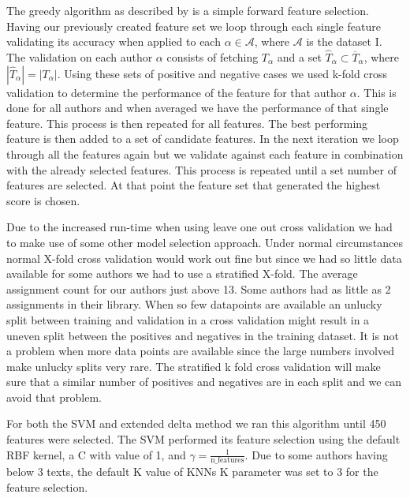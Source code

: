 The greedy algorithm as described by \citet{kanDeng} is a simple forward feature
selection. Having our previously created feature set we loop through each single
feature validating its accuracy when applied to each $\alpha \in \mathcal{A}$,
where $\mathcal{A}$ is the dataset \gls{I}. The validation on each author
$\alpha$ consists of fetching $T_{\alpha}$ and a set $\hat{T}_{\alpha} \subset
\overline{T}_\alpha$, where $|\hat{T}_\alpha| = |T_\alpha|$. Using these sets
of positive and negative cases we used k-fold cross validation to determine
the performance of the feature for that author $\alpha$. This is done for all
authors and when averaged we have the performance of that single feature. This
process is then repeated for all features. The best performing feature is then
added to a set of candidate features. In the next iteration we loop through all
the features again but we validate against each feature in combination with
the already selected features. This process is repeated until a set number of
features are selected. At that point the feature set that generated the highest
score is chosen.

Due to the increased run-time when using leave one out cross validation we had
to make use of some other model selection approach. Under normal circumstances
normal X-fold cross validation would work out fine but since we had so little
data available for some authors we had to use a stratified X-fold. The average
assignment count for our authors just above 13. Some authors had as little as
2 assignments in their library. When so few datapoints are available an unlucky
split between training and validation in a cross validation might result in a
uneven split between the positives and negatives in the training dataset. It is
not a problem when more data points are available since the large numbers
involved make unlucky splits very rare. The stratified k fold cross validation
will make sure that a similar number of positives and negatives are in each
split and we can avoid that problem.

For both the \gls{SVM} and extended delta method we ran this algorithm
until 450 features were selected. The \gls{SVM} performed its feature selection
using the default RBF kernel, a C with value of 1, and $\gamma =
\frac{1}{\text{n\_features}}$. Due to some authors having below 3 texts,
the default K value of \glspl{KNN} K parameter was set to 3 for the feature
selection.

